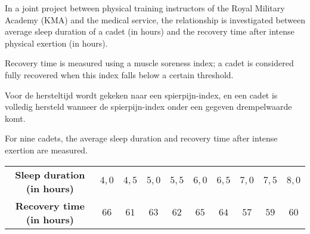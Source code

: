 \begin{question}{22}{
    In a joint project between physical training instructors of the Royal Military Academy (KMA) and the medical service, the relationship is investigated
    between average sleep duration of a cadet (in hours) and the recovery time after intense physical exertion (in hours).
    
    Recovery time is measured using a muscle soreness index; a cadet is considered fully recovered when this index falls below a certain threshold.

    Voor de hersteltijd wordt gekeken naar een spierpijn-index, en een cadet is volledig hersteld wanneer de spierpijn-index onder een gegeven drempelwaarde komt.

    For nine cadets, the average sleep duration and recovery time after intense exertion are measured.
    \begin{center}
        \begin{tabular}{c|ccccccccc}
            \toprule
                \textbf{Sleep duration (in hours)} & $4,0$ & $4,5$ & $5,0$ & $5,5$ & $6,0$ & $6,5$ & $7,0$ & $7,5$ & $8,0$ \\
                \textbf{Recovery time (in hours)} & $66$ & $61$ & $63$ & $62$ & $65$ & $64$ & $57$ & $59$ & $60$ \\
            \bottomrule
        \end{tabular}
    \end{center}
}
    


\end{question}
